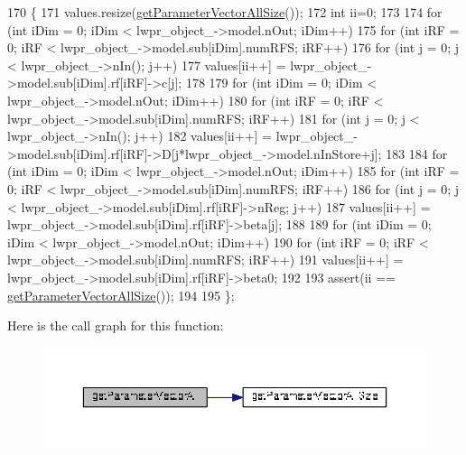 \begin{DoxyCode}
170 \{
171   values.resize(\hyperlink{classDmpBbo_1_1ModelParametersLWPR_ab24d2485b3b795b516f4844f225100eb}{getParameterVectorAllSize}());
172   \textcolor{keywordtype}{int} ii=0;
173   
174   \textcolor{keywordflow}{for} (\textcolor{keywordtype}{int} iDim = 0; iDim < lwpr\_object\_->model.nOut; iDim++)
175     \textcolor{keywordflow}{for} (\textcolor{keywordtype}{int} iRF = 0; iRF < lwpr\_object\_->model.sub[iDim].numRFS; iRF++)
176       \textcolor{keywordflow}{for} (\textcolor{keywordtype}{int} j = 0; j < lwpr\_object\_->nIn(); j++)
177        values[ii++] = lwpr\_object\_->model.sub[iDim].rf[iRF]->c[j];
178 
179   for (\textcolor{keywordtype}{int} iDim = 0; iDim < lwpr\_object\_->model.nOut; iDim++)
180     \textcolor{keywordflow}{for} (\textcolor{keywordtype}{int} iRF = 0; iRF < lwpr\_object\_->model.sub[iDim].numRFS; iRF++)
181       \textcolor{keywordflow}{for} (\textcolor{keywordtype}{int} j = 0; j < lwpr\_object\_->nIn(); j++)
182         values[ii++] = lwpr\_object\_->model.sub[iDim].rf[iRF]->D[j*lwpr\_object\_->model.nInStore+j];
183 
184   for (\textcolor{keywordtype}{int} iDim = 0; iDim < lwpr\_object\_->model.nOut; iDim++)
185     \textcolor{keywordflow}{for} (\textcolor{keywordtype}{int} iRF = 0; iRF < lwpr\_object\_->model.sub[iDim].numRFS; iRF++)
186       \textcolor{keywordflow}{for} (\textcolor{keywordtype}{int} j = 0; j < lwpr\_object\_->model.sub[iDim].rf[iRF]->nReg; j++)
187         values[ii++] = lwpr\_object\_->model.sub[iDim].rf[iRF]->beta[j];
188       
189   for (\textcolor{keywordtype}{int} iDim = 0; iDim < lwpr\_object\_->model.nOut; iDim++)
190     \textcolor{keywordflow}{for} (\textcolor{keywordtype}{int} iRF = 0; iRF < lwpr\_object\_->model.sub[iDim].numRFS; iRF++)
191       values[ii++] = lwpr\_object\_->model.sub[iDim].rf[iRF]->beta0;
192   
193   assert(ii == \hyperlink{classDmpBbo_1_1ModelParametersLWPR_ab24d2485b3b795b516f4844f225100eb}{getParameterVectorAllSize}()); 
194   
195 \};
\end{DoxyCode}


Here is the call graph for this function\+:
\nopagebreak
\begin{figure}[H]
\begin{center}
\leavevmode
\includegraphics[width=350pt]{classDmpBbo_1_1ModelParametersLWPR_a29429ff2771d1e56cfba7250d38da4b1_cgraph}
\end{center}
\end{figure}


